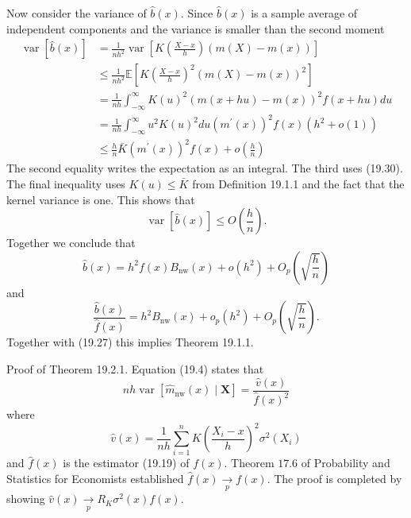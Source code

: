 \documentclass[10pt]{article}
\begin{document}
Now consider the variance of $\widehat{b}(x)$. Since $\widehat{b}(x)$ is a sample average of independent components and the variance is smaller than the second moment
$$
\begin{aligned}
\operatorname{var}[\widehat{b}(x)] &=\frac{1}{n h^{2}} \operatorname{var}\left[K\left(\frac{X-x}{h}\right)(m(X)-m(x))\right] \\
& \leq \frac{1}{n h^{2}} \mathbb{E}\left[K\left(\frac{X-x}{h}\right)^{2}(m(X)-m(x))^{2}\right] \\
&=\frac{1}{n h} \int_{-\infty}^{\infty} K(u)^{2}(m(x+h u)-m(x))^{2} f(x+h u) d u \\
&=\frac{1}{n h} \int_{-\infty}^{\infty} u^{2} K(u)^{2} d u\left(m^{\prime}(x)\right)^{2} f(x)\left(h^{2}+o(1)\right) \\
& \leq \frac{h}{n} \bar{K}\left(m^{\prime}(x)\right)^{2} f(x)+o\left(\frac{h}{n}\right)
\end{aligned}
$$
The second equality writes the expectation as an integral. The third uses (19.30). The final inequality uses $K(u) \leq \bar{K}$ from Definition 19.1.1 and the fact that the kernel variance is one. This shows that
$$
\operatorname{var}[\widehat{b}(x)] \leq O\left(\frac{h}{n}\right) .
$$
Together we conclude that
$$
\widehat{b}(x)=h^{2} f(x) B_{\mathrm{nw}}(x)+o\left(h^{2}\right)+O_{p}\left(\sqrt{\frac{h}{n}}\right)
$$
and
$$
\frac{\widehat{b}(x)}{\widehat{f}(x)}=h^{2} B_{\mathrm{nw}}(x)+o_{p}\left(h^{2}\right)+O_{p}\left(\sqrt{\frac{h}{n}}\right) .
$$
Together with (19.27) this implies Theorem 19.1.1.

Proof of Theorem 19.2.1. Equation (19.4) states that
$$
n h \operatorname{var}\left[\widehat{m}_{\mathrm{nw}}(x) \mid \boldsymbol{X}\right]=\frac{\widehat{v}(x)}{\widehat{f}(x)^{2}}
$$
where
$$
\widehat{v}(x)=\frac{1}{n h} \sum_{i=1}^{n} K\left(\frac{X_{i}-x}{h}\right)^{2} \sigma^{2}\left(X_{i}\right)
$$
and $\widehat{f}(x)$ is the estimator (19.19) of $f(x)$. Theorem $17.6$ of Probability and Statistics for Economists established $\widehat{f}(x) \underset{p}{\longrightarrow} f(x)$. The proof is completed by showing $\widehat{v}(x) \underset{p}{\rightarrow} R_{K} \sigma^{2}(x) f(x)$.
\end{document}
